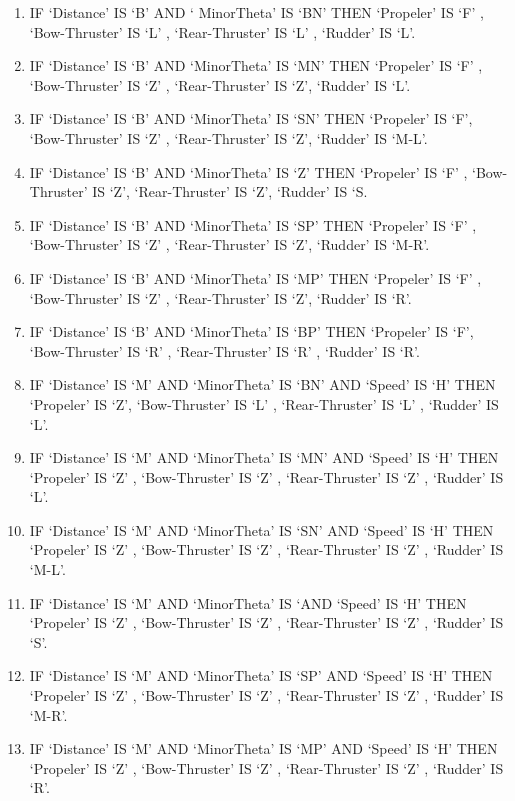 \begin{enumerate} \itemsep3pt

\item	IF ‘Distance’ IS ‘B’ AND ‘ MinorTheta’ IS  ‘BN’  THEN  ‘Propeler’ IS ‘F’ , ‘Bow-Thruster’ IS ‘L’ , ‘Rear-Thruster’ IS ‘L’ , ‘Rudder’ IS ‘L’.  
\item	IF ‘Distance’ IS ‘B’ AND ‘MinorTheta’ IS ‘MN’ THEN ‘Propeler’ IS ‘F’ , ‘Bow-Thruster’ IS ‘Z’ , ‘Rear-Thruster’ IS  ‘Z’,  ‘Rudder’ IS ‘L’.  
\item	IF ‘Distance’ IS ‘B’ AND ‘MinorTheta’ IS ‘SN’ THEN ‘Propeler’ IS ‘F’,  ‘Bow-Thruster’ IS ‘Z’ , ‘Rear-Thruster’ IS  ‘Z’,  ‘Rudder’ IS ‘M-L’.  
\item	IF ‘Distance’ IS ‘B’ AND ‘MinorTheta’ IS ‘Z’  THEN ‘Propeler’ IS ‘F’ , ‘Bow-Thruster’ IS ‘Z’,  ‘Rear-Thruster’ IS  ‘Z’,  ‘Rudder’ IS ‘S.  
\item	IF ‘Distance’ IS ‘B’ AND ‘MinorTheta’ IS ‘SP’ THEN ‘Propeler’ IS ‘F’ , ‘Bow-Thruster’ IS ‘Z’ , ‘Rear-Thruster’ IS  ‘Z’,  ‘Rudder’ IS ‘M-R’.  
\item	IF ‘Distance’ IS ‘B’ AND ‘MinorTheta’ IS ‘MP’ THEN ‘Propeler’ IS ‘F’ ,  ‘Bow-Thruster’ IS ‘Z’ , ‘Rear-Thruster’ IS  ‘Z’,  ‘Rudder’ IS ‘R’.  
\item IF ‘Distance’ IS ‘B’ AND ‘MinorTheta’ IS ‘BP’ THEN ‘Propeler’ IS ‘F’, ‘Bow-Thruster’ IS ‘R’ ,  ‘Rear-Thruster’ IS  ‘R’ ,  ‘Rudder’ IS ‘R’.  
\item	IF ‘Distance’ IS  ‘M’  AND  ‘MinorTheta’ IS ‘BN’  AND ‘Speed’ IS ‘H’ THEN ‘Propeler’ IS ‘Z’,  ‘Bow-Thruster’ IS ‘L’ ,  ‘Rear-Thruster’ IS  ‘L’ ,  ‘Rudder’ IS ‘L’.  
\item	IF ‘Distance’ IS  ‘M’  AND  ‘MinorTheta’ IS ‘MN’ AND ‘Speed’ IS ‘H’  THEN ‘Propeler’ IS ‘Z’ ,  ‘Bow-Thruster’ IS ‘Z’ ,  ‘Rear-Thruster’ IS  ‘Z’  , ‘Rudder’ IS ‘L’.  
\item	IF ‘Distance’ IS  ‘M’  AND ‘MinorTheta’ IS ‘SN’  AND ‘Speed’ IS ‘H’ THEN ‘Propeler’ IS ‘Z’ , ‘Bow-Thruster’ IS ‘Z’ ,  ‘Rear-Thruster’ IS  ‘Z’  , ‘Rudder’ IS ‘M-L’.  
\item	IF ‘Distance’ IS ‘M’  AND ‘MinorTheta’ IS ‘AND ‘Speed’ IS ‘H’ THEN ‘Propeler’ IS ‘Z’ , ‘Bow-Thruster’ IS ‘Z’ ,  ‘Rear-Thruster’ IS  ‘Z’ ,  ‘Rudder’ IS ‘S’.  
\item	IF ‘Distance’ IS ‘M’  AND ‘MinorTheta’ IS ‘SP’  AND ‘Speed’ IS ‘H’ THEN ‘Propeler’ IS ‘Z’ , ‘Bow-Thruster’ IS ‘Z’ ,  ‘Rear-Thruster’ IS  ‘Z’  , ‘Rudder’ IS ‘M-R’.  
\item	IF ‘Distance’ IS ‘M’  AND ‘MinorTheta’ IS ‘MP’  AND ‘Speed’ IS ‘H’ THEN ‘Propeler’ IS ‘Z’ , ‘Bow-Thruster’ IS ‘Z’  , ‘Rear-Thruster’ IS  ‘Z’  , ‘Rudder’ IS ‘R’.  

\end{enumerate}
